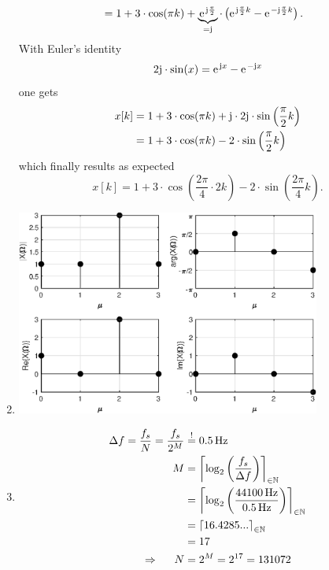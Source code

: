 \documentclass[11pt,a4paper,DIV=12]{scrartcl}
\begin{document}
\begin{Loesung}
\begin{enumerate}[label=\alph*)]
\begin{align}
	&=1+3\cdot\cos(\pi k)+\underbrace{\e^{\im\frac{\pi}{2}}}_{=\im}\cdot\left(\e^{\im\frac{\pi}{2}k}-\e^{-\im\frac{\pi}{2}k}\right).\nonumber
	\end{align}
 With Euler's identity
	\begin{equation}
	2\im\cdot\sin(x)=\e^{\im x}-\e^{-\im x}\nonumber
	\end{equation}
	one gets
	\begin{align}
	x[k]&=1+3\cdot\cos(\pi k)+\im\cdot2\im\cdot\sin\left(\frac{\pi}{2}k\right)\nonumber\\
	&=1+3\cdot\cos(\pi k)-2\cdot\sin\left(\frac{\pi}{2}k\right)\nonumber
	\end{align}
	which finally results as expected
	\begin{equation}
	x[k]=1+3\cdot\cos\left(\frac{2\pi}{4}\cdot2k\right)-2\cdot\sin\left(\frac{2\pi}{4}k\right).\nonumber
	\end{equation}
	\item \text{}
	\begin{center}%
		\includegraphics[width=10cm]{graphics/UE1_Exercise2_IDFT}%
	\end{center}%
	\item \begin{align}
	\Delta f=\frac{f_s}{N}=\frac{f_s}{2^M}&\stackrel{!}{=}0.5\,\text{Hz}\nonumber\\
	M&=\left\lceil\log_{2}\left(\frac{f_s}{\Delta f}\right)\right\rceil_{\in\mathbb{N}}\nonumber\\
	&=\left\lceil\log_{2}\left(\frac{44100\,\text{Hz}}{0.5\,\text{Hz}}\right)\right\rceil_{\in\mathbb{N}}\nonumber\\
	&=\left\lceil16.4285...\right\rceil_{\in\mathbb{N}}\nonumber\\
	&=17\nonumber\\
	\Rightarrow\hspace{5mm} N&=2^M=2^{17}=131072\nonumber

\end{align}
\end{enumerate}
\end{Loesung}
\end{document}
